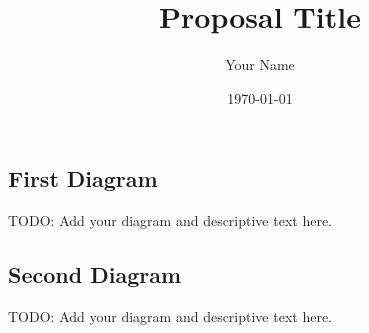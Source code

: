 \documentclass[11pt]{article} %
\title{Proposal Title}
\author{Your Name}
\date{\today}
\begin{document}
\maketitle


\subsection*{First Diagram}
\label{sec:diagram1}

TODO: Add your diagram and descriptive text  here.

\subsection*{Second Diagram}
\label{sec:diagram2}

TODO: Add your diagram and descriptive text here.
\end{document}
